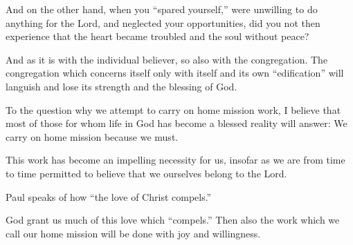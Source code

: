 And on the other hand, when you “spared yourself,” were unwilling to do anything for the Lord, and neglected your opportunities, did you not then experience that the heart became troubled and the soul without peace?

And as it is with the individual believer, so also with the congregation. The congregation which concerns itself only with itself and its own “edification” will languish and lose its strength and the blessing of God.

To the question why we attempt to carry on home mission work, I believe that most of those for whom life in God has become a blessed reality will answer: We carry on home mission because we must.

This work has become an impelling necessity for us, insofar as we are from time to time permitted to believe that we ourselves belong to the Lord.

Paul speaks of how “the love of Christ compels.”

God grant us much of this love which “compels.” Then also the work which we call our home mission will be done with joy and willingness.
